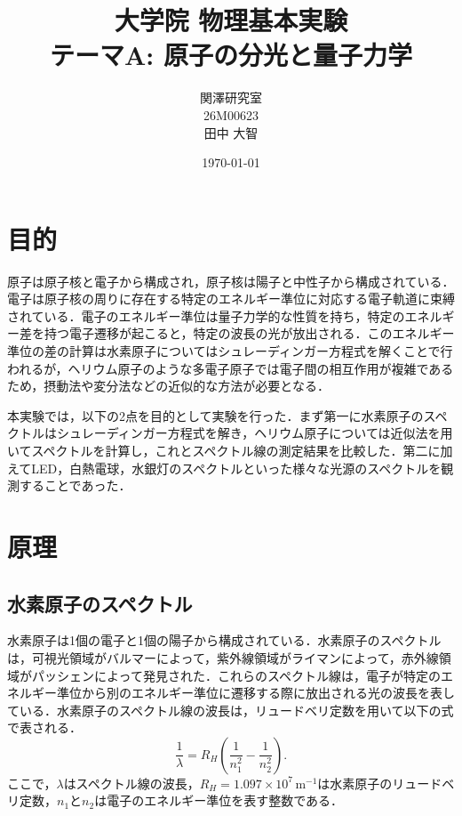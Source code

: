 \documentclass[a4paper,dvipdfmx,10.5pt]{jarticle}
\title{大学院 物理基本実験\\テーマA: 原子の分光と量子力学}
\author{関澤研究室\\26M00623\\田中 大智}
\date{\today}
\begin{document}
\maketitle
\section{目的}
 原子は原子核と電子から構成され，原子核は陽子と中性子から構成されている．電子は原子核の周りに存在する特定のエネルギー準位に対応する電子軌道に束縛されている．電子のエネルギー準位は量子力学的な性質を持ち，特定のエネルギー差を持つ電子遷移が起こると，特定の波長の光が放出される．このエネルギー準位の差の計算は水素原子についてはシュレーディンガー方程式を解くことで行われるが，ヘリウム原子のような多電子原子では電子間の相互作用が複雑であるため，摂動法や変分法などの近似的な方法が必要となる．

 本実験では，以下の2点を目的として実験を行った．まず第一に水素原子のスペクトルはシュレーディンガー方程式を解き，ヘリウム原子については近似法を用いてスペクトルを計算し，これとスペクトル線の測定結果を比較した．第二に加えてLED，白熱電球，水銀灯のスペクトルといった様々な光源のスペクトルを観測することであった．
\section{原理}
\subsection{水素原子のスペクトル}
水素原子は1個の電子と1個の陽子から構成されている．水素原子のスペクトルは，可視光領域がバルマーによって，紫外線領域がライマンによって，赤外線領域がパッシェンによって発見された．これらのスペクトル線は，電子が特定のエネルギー準位から別のエネルギー準位に遷移する際に放出される光の波長を表している．水素原子のスペクトル線の波長は，リュードベリ定数を用いて以下の式で表される．
\begin{equation}
  \frac{1}{\lambda} = R_H \left( \frac{1}{n_1^2} - \frac{1}{n_2^2} \right).\label{eq:Rydberg}
\end{equation}
ここで，$\lambda$はスペクトル線の波長，$R_H=1.097 \times 10^7 \, \text{m}^{-1}$は水素原子のリュードベリ定数，$n_1$と$n_2$は電子のエネルギー準位を表す整数である．
\end{document}
